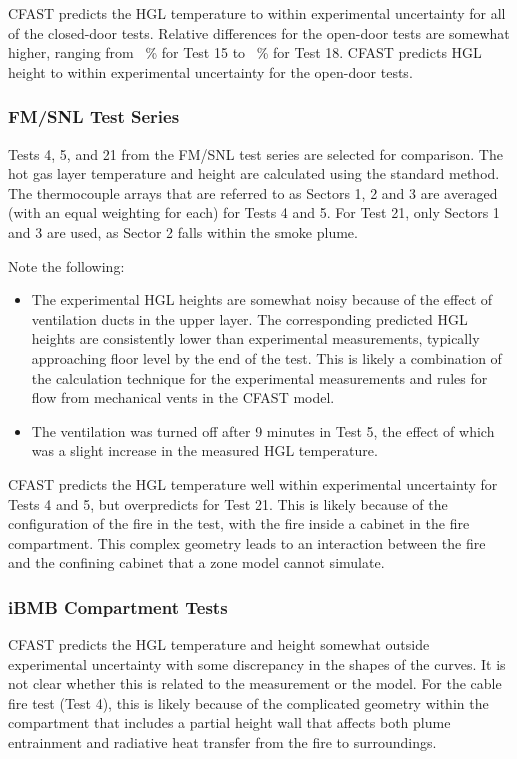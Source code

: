 CFAST predicts the HGL temperature to within experimental uncertainty for all of the closed-door tests.  Relative differences for the open-door tests are somewhat higher, ranging from \HGLnistnrclow~\% for Test 15 to \HGLnistnrchi~\% for Test 18.  CFAST predicts HGL height to within experimental uncertainty for the open-door tests.  

\subsubsection{FM/SNL Test Series}

Tests 4, 5, and 21 from the FM/SNL test series are selected for comparison. The hot gas layer temperature and height are calculated using the standard method. The thermocouple arrays that are referred to as Sectors 1, 2 and 3 are averaged (with an equal weighting for each) for Tests 4 and 5. For Test 21, only Sectors 1 and 3 are used, as Sector 2 falls within the smoke plume. 

Note the following:
\begin{itemize}
\item The experimental HGL heights are somewhat noisy because of the effect of ventilation ducts in the upper layer.  The corresponding predicted HGL heights are consistently lower than experimental measurements, typically approaching floor level by the end of the test.  This is likely a combination of the calculation technique for the experimental measurements and rules for flow from mechanical vents in the CFAST model.
\item The ventilation was turned off after 9 minutes in Test 5, the effect of which was a slight increase in the measured HGL temperature.
\end{itemize}

CFAST predicts the HGL temperature well within experimental uncertainty for Tests 4 and 5, but overpredicts for Test 21.  This is likely because of the configuration of the fire in the test, with the fire inside a cabinet in the fire compartment.  This complex geometry leads to an interaction between the fire and the confining cabinet that a zone model cannot simulate.

\subsubsection{iBMB Compartment Tests}

CFAST predicts the HGL temperature and height somewhat outside experimental uncertainty with 	some discrepancy in the shapes of the curves. It is not clear whether this is related to the measurement or the model. For the cable fire test (Test 4), this is likely because of the complicated geometry within the compartment that includes a partial height wall that affects both plume entrainment and radiative heat transfer from the fire to surroundings.

